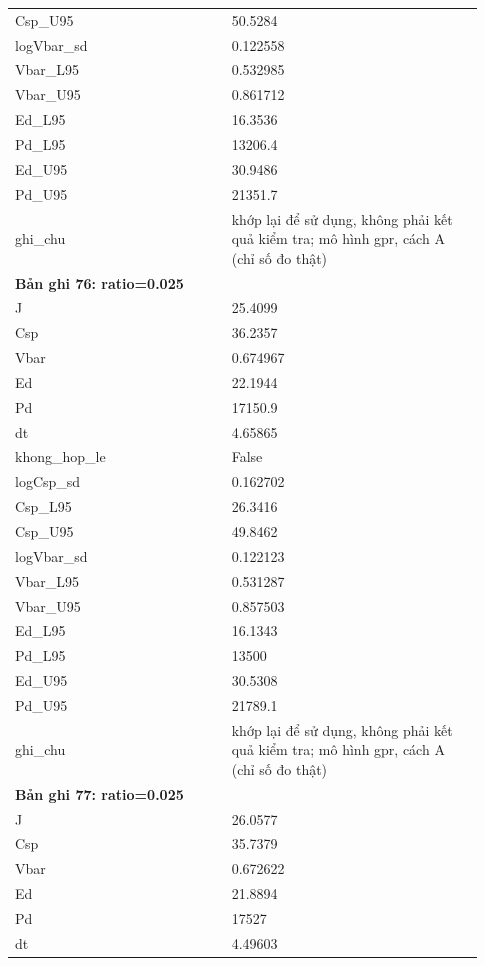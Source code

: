 \begin{longtable}{p{0.43\linewidth}p{0.50\linewidth}}
Csp\_\allowbreak U95 & 50.5284 \\
logVbar\_\allowbreak sd & 0.122558 \\
Vbar\_\allowbreak L95 & 0.532985 \\
Vbar\_\allowbreak U95 & 0.861712 \\
Ed\_\allowbreak L95 & 16.3536 \\
Pd\_\allowbreak L95 & 13206.4 \\
Ed\_\allowbreak U95 & 30.9486 \\
Pd\_\allowbreak U95 & 21351.7 \\
ghi\_\allowbreak chu & khớp lại để sử dụng, không phải kết quả kiểm tra; mô hình gpr, cách A (chỉ số đo thật) \\
\midrule
\multicolumn{2}{p{0.95\linewidth}}{\textbf{Bản ghi 76: ratio=0.025}} \\
J & 25.4099 \\
Csp & 36.2357 \\
Vbar & 0.674967 \\
Ed & 22.1944 \\
Pd & 17150.9 \\
dt & 4.65865 \\
khong\_\allowbreak hop\_\allowbreak le & False \\
logCsp\_\allowbreak sd & 0.162702 \\
Csp\_\allowbreak L95 & 26.3416 \\
Csp\_\allowbreak U95 & 49.8462 \\
logVbar\_\allowbreak sd & 0.122123 \\
Vbar\_\allowbreak L95 & 0.531287 \\
Vbar\_\allowbreak U95 & 0.857503 \\
Ed\_\allowbreak L95 & 16.1343 \\
Pd\_\allowbreak L95 & 13500 \\
Ed\_\allowbreak U95 & 30.5308 \\
Pd\_\allowbreak U95 & 21789.1 \\
ghi\_\allowbreak chu & khớp lại để sử dụng, không phải kết quả kiểm tra; mô hình gpr, cách A (chỉ số đo thật) \\
\midrule
\multicolumn{2}{p{0.95\linewidth}}{\textbf{Bản ghi 77: ratio=0.025}} \\
J & 26.0577 \\
Csp & 35.7379 \\
Vbar & 0.672622 \\
Ed & 21.8894 \\
Pd & 17527 \\
dt & 4.49603 \\

\end{longtable}
